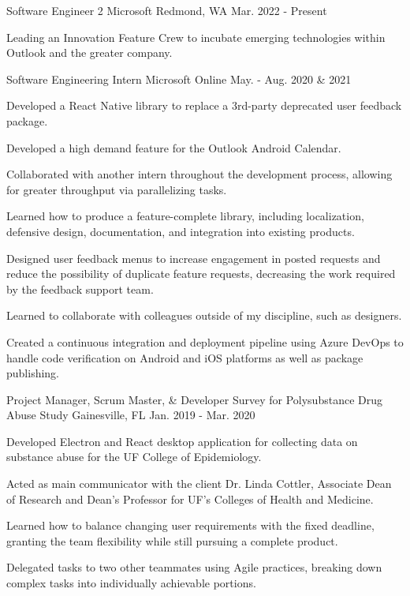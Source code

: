 \begin{cventries}
  \cventry
    {Software Engineer 2}
    {Microsoft}
    {Redmond, WA}
    {Mar. 2022 - Present}
    {
      \begin{cvitems}
        \item{Leading an Innovation Feature Crew to incubate emerging technologies within Outlook and the greater company.}
      \end{cvitems}
    }
  \cventry
    {Software Engineering Intern}
    {Microsoft}
    {Online}
    {May. - Aug. 2020 \& 2021}
    {
      \begin{cvitems}
        \item{Developed a React Native library to replace a 3rd-party deprecated user feedback package.}
        \item{Developed a high demand feature for the Outlook Android Calendar.}
        \item{Collaborated with another intern throughout the development process, allowing for greater throughput via parallelizing tasks.}
        \item{Learned how to produce a feature-complete library, including localization, defensive design, documentation, and integration into existing products.}
        \item{Designed user feedback menus to increase engagement in posted requests and reduce the possibility of duplicate feature requests, decreasing the work required by the feedback support team.}
        \item{Learned to collaborate with colleagues outside of my discipline, such as designers.}
        \item{Created a continuous integration and deployment pipeline using Azure DevOps to handle code verification on Android and iOS platforms as well as package publishing.}
      \end{cvitems}
    }
  \cventry
    {Project Manager, Scrum Master, \& Developer}
    {Survey for Polysubstance Drug Abuse Study}
    {Gainesville, FL}
    {Jan. 2019 - Mar. 2020}
    {
      \begin{cvitems}
        \item {Developed Electron and React desktop application for collecting data on substance abuse for the UF College of Epidemiology.}
        \item {Acted as main communicator with the client Dr. Linda Cottler, Associate Dean of Research and Dean's Professor for UF's Colleges of Health and Medicine.}
        \item {Learned how to balance changing user requirements with the fixed deadline, granting the team flexibility while still pursuing a complete product.}
        \item {Delegated tasks to two other teammates using Agile practices, breaking down complex tasks into individually achievable portions.}
      \end{cvitems}
    }
\end{cventries}

